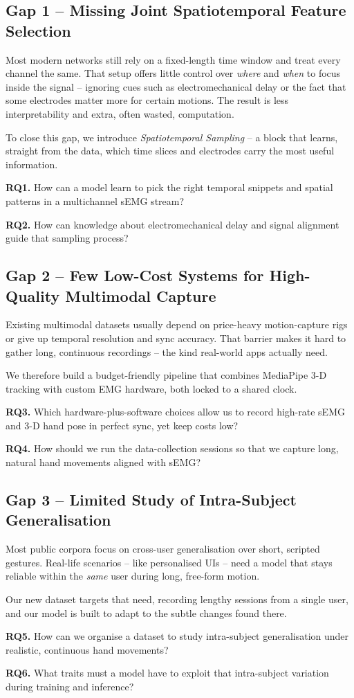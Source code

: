 \subsection*{Gap 1 -- Missing Joint Spatiotemporal Feature Selection}

Most modern networks still rely on a fixed-length time window and treat every channel the same. That setup offers little control over \emph{where} and \emph{when} to focus inside the signal -- ignoring cues such as electromechanical delay or the fact that some electrodes matter more for certain motions. The result is less interpretability and extra, often wasted, computation.

To close this gap, we introduce \textit{Spatiotemporal Sampling} -- a block that learns, straight from the data, which time slices and electrodes carry the most useful information.

\textbf{RQ1.} How can a model learn to pick the right temporal snippets and spatial patterns in a multichannel sEMG stream?

\textbf{RQ2.} How can knowledge about electromechanical delay and signal alignment guide that sampling process?

\subsection*{Gap 2 -- Few Low-Cost Systems for High-Quality Multimodal Capture}

Existing multimodal datasets usually depend on price-heavy motion-capture rigs or give up temporal resolution and sync accuracy. That barrier makes it hard to gather long, continuous recordings -- the kind real-world apps actually need.

We therefore build a budget-friendly pipeline that combines MediaPipe 3-D tracking with custom EMG hardware, both locked to a shared clock.

\textbf{RQ3.} Which hardware-plus-software choices allow us to record high-rate sEMG and 3-D hand pose in perfect sync, yet keep costs low?

\textbf{RQ4.} How should we run the data-collection sessions so that we capture long, natural hand movements aligned with sEMG?

\subsection*{Gap 3 -- Limited Study of Intra-Subject Generalisation}

Most public corpora focus on cross-user generalisation over short, scripted gestures. Real-life scenarios -- like personalised UIs -- need a model that stays reliable within the \emph{same} user during long, free-form motion.

Our new dataset targets that need, recording lengthy sessions from a single user, and our model is built to adapt to the subtle changes found there.

\textbf{RQ5.} How can we organise a dataset to study intra-subject generalisation under realistic, continuous hand movements?

\textbf{RQ6.} What traits must a model have to exploit that intra-subject variation during training and inference?
